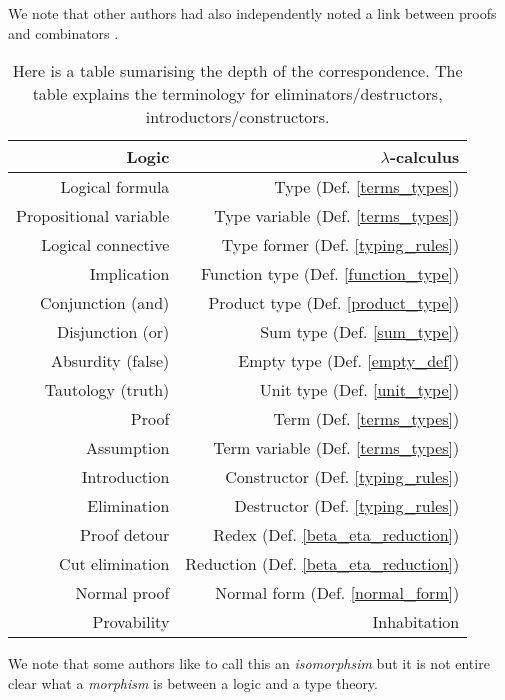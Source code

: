 \begin{remark}
    We note that other authors had also independently noted a link between proofs and combinators \cite{meredith1963}. 
\end{remark} 

\begin{table}
  \centering
    \begin{tabular}{r|r}
        Logic & $\lambda$-calculus \\
        \hline  
        Logical formula & Type (Def. \ref{terms_types}) \\
        Propositional variable & Type variable (Def. \ref{terms_types}) \\
        Logical connective & Type former (Def. \ref{typing_rules}) \\
        Implication & Function type (Def. \ref{function_type}) \\
        Conjunction (and) & Product type (Def. \ref{product_type}) \\
        Disjunction (or) & Sum type (Def. \ref{sum_type}) \\
        Absurdity (false) & Empty type (Def. \ref{empty_def}) \\
        Tautology (truth) & Unit type (Def. \ref{unit_type}) \\
        Proof & Term (Def. \ref{terms_types}) \\
        Assumption & Term variable (Def. \ref{terms_types}) \\
        Introduction & Constructor (Def. \ref{typing_rules}) \\
        Elimination & Destructor (Def. \ref{typing_rules}) \\
        Proof detour & Redex (Def. \ref{beta_eta_reduction}) \\
        Cut elimination & Reduction (Def. \ref{beta_eta_reduction}) \\
        Normal proof & Normal form (Def. \ref{normal_form}) \\
        Provability & Inhabitation   
    \end{tabular}
    \caption{Here is a table sumarising the depth of the correspondence. The table explains the terminology for eliminators/destructors, introductors/constructors.}
    \label{tab1}
\end{table}

\begin{remark}
    We note that some authors like to call this an \emph{isomorphsim} but it is not entire clear what a \emph{morphism} is between a logic and a type theory.
\end{remark}











